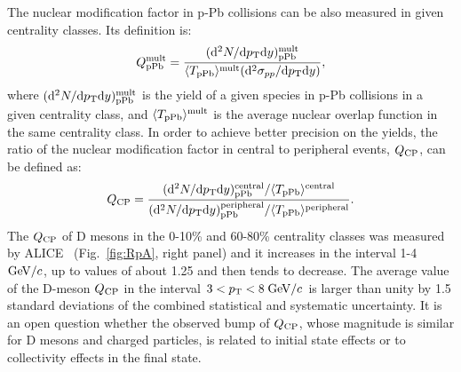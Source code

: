 The nuclear modification factor in p-Pb collisions can be also measured in given centrality classes.
Its definition is:
\begin{equation}
Q_{\rm pPb}^{\rm mult} = \frac{({\rm d}^2 N/{\rm d} p_{\rm T} {\rm d} y)^{\rm mult}_{\rm pPb}}{\langle T_{\rm pPb} \rangle ^{\rm mult}({\rm d}^2 \sigma_{pp}/{\rm d} p_{\rm T} {\rm d} y)},
\end{equation}
where $({\rm d}^2 N/{\rm d} p_{\rm T} {\rm d} y)^{\rm mult}_{\rm pPb}$ 
is the yield of a given species in p-Pb collisions 
in a given centrality class, and $\langle T_{\rm pPb} \rangle ^{\rm mult}$ is the average nuclear 
overlap function in the same centrality class.
In order to achieve better precision on the yields, the ratio of the nuclear 
modification factor in central to peripheral events, $Q_{\rm CP}$, 
can be defined as:
\begin{equation}
Q_{\rm CP} = \frac{({\rm d}^2 N/{\rm d} p_{\rm T} {\rm d} y)^{\rm central}_{\rm pPb}/ \langle T_{\rm pPb} \rangle^{\rm central}}{({\rm d}^2 N/{\rm d} p_{\rm T} {\rm d} y)^{\rm peripheral}_{\rm pPb}/ \langle T_{\rm pPb} \rangle^{\rm peripheral}}.
\label{eq:QCP}
\end{equation}
The $Q_{\rm CP}$ of D mesons in the 0-10\% and 60-80\% 
centrality classes was measured by 
ALICE~\cite{ALICEPAS2017008} (Fig.~\ref{fig:RpA}, right panel) 
and it increases in the interval 1-4 $\mathrm{GeV}/c$, 
up to values of about 1.25 and then tends to decrease. The 
average value of the D-meson $Q_{\rm CP}$ 
in the interval $3 < p_{\rm T} < 8 \; \mathrm{GeV}/c$ is larger than unity by 1.5 
standard deviations of the combined statistical and systematic uncertainty.
It is an open question whether the observed bump of $Q_{\rm CP}$, whose magnitude is similar 
for D mesons and charged particles, is related to initial state effects 
or to collectivity effects in the final state.

